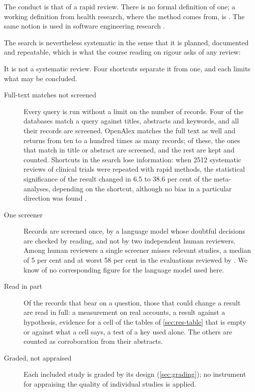The conduct is that of a rapid review.
There is no formal definition of one; a working definition from health
research, where the method comes from, is
.
The same notion is used in software engineering
research \autocite{Cartaxo2020RapidReviewsSE}.

The search is nevertheless systematic in the sense that it is planned,
documented and repeatable, which is what the course reading on rigour
asks of any review:

It is not a systematic review.
Four shortcuts separate it from one, and each limits what may be
concluded.
\begin{description}
  \item[Full-text matches not screened] Every query is run without a
    limit on the number of records.
    Four of the databases match a query against titles, abstracts and
    keywords, and all their records are screened.
    OpenAlex matches the full text as well and returns from ten to a
    hundred times as many records; of these, the ones that match in
    title or abstract are screened, and the rest are kept and counted.
    Shortcuts in the search lose information: when 2512 systematic
    reviews of clinical trials were repeated with rapid methods, the
    statistical significance of the result changed in 6.5 to 38.6 per
    cent of the meta-analyses, depending on the shortcut, although no
    bias in a particular direction was
    found \autocite{Marshall2019RapidVsSystematic}.
  \item[One screener] Records are screened once, by a language model
    whose doubtful decisions are checked by reading, and not by two
    independent human reviewers.
    Among human reviewers a single screener misses relevant studies, a
    median of 5 per cent and at worst 58 per cent in the evaluations
    reviewed by \textcite{Waffenschmidt2019SingleScreening}.
    We know of no corresponding figure for the language model used here.
  \item[Read in part] Of the records that bear on a question, those
    that could change a result are read in full: a measurement on real
    accounts, a result against a hypothesis, evidence for a cell of the
    tables of \cref{sec:res-table} that is empty or against what a cell
    says, a test of a key used alone.
    The others are counted as corroboration from their abstracts.
  \item[Graded, not appraised] Each included study is graded by its
    design (\cref{sec:grading}); no instrument for appraising the quality
    of individual studies is applied.
\end{description}
